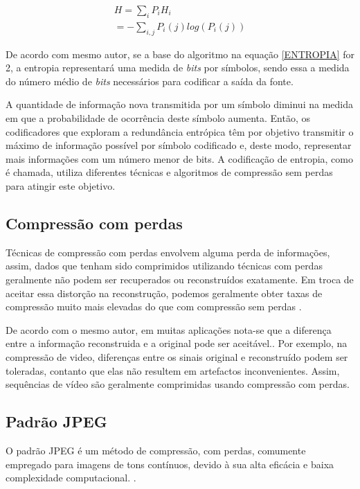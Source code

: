 \begin{equation}
\label{ENTROPIA}
	\begin{split}
		H = \sum_i P_iH_i\\
		= - \sum_{i,j} P_i(j) log(P_i(j))
	\end{split}
\end{equation}

De acordo com mesmo autor, se a base do algoritmo na equação \ref{ENTROPIA} for 2, a entropia representará uma medida de \textit{bits} por símbolos, sendo essa a medida do número médio de \textit{bits} necessários para codificar a saída da fonte. 

A quantidade de informação nova transmitida por um símbolo diminui na medida em que a probabilidade de ocorrência deste símbolo aumenta. Então, os codificadores que exploram a redundância entrópica têm por objetivo transmitir o máximo de informação possível por símbolo codificado e, deste modo, representar
mais informações com um número menor de bits. A codificação de entropia, como é chamada, utiliza diferentes técnicas e algoritmos de compressão sem perdas para atingir este objetivo. \cite{da2007estudo}

\subsection{Compressão com perdas}

Técnicas de compressão com perdas envolvem alguma perda de informações, assim, dados que tenham sido comprimidos utilizando técnicas com perdas geralmente não podem ser recuperados ou reconstruídos exatamente. Em troca de aceitar essa distorção na reconstrução, podemos geralmente obter taxas de compressão muito mais elevadas do que com compressão sem perdas  \cite{sayood2012introduction}.

De acordo com o mesmo autor, em muitas aplicações nota-se que a diferença entre a informação reconstruida e a original pode ser aceitável.. Por exemplo, na compressão de video, diferenças entre os sinais original e reconstruído podem ser toleradas, contanto que elas não resultem em artefactos inconvenientes. Assim, sequências de vídeo são geralmente comprimidas usando compressão com perdas.

\subsection{Padrão JPEG} \label{JPEG}
 O padrão JPEG é um método de compressão, com perdas, comumente empregado para imagens de tons contínuos, devido à sua alta eficácia e baixa complexidade computacional. \cite{wang2008jpeg}.
 
